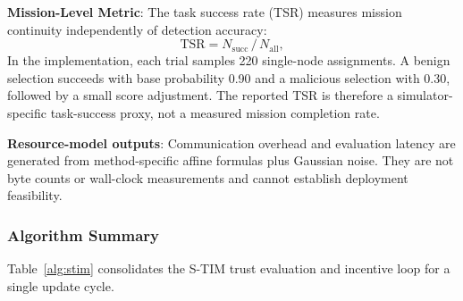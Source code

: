 \documentclass[notspecified,article,submit,moreauthors]{Definitions/mdpi}
\begin{document}
\textbf{Mission-Level Metric}: The task success rate (TSR) measures mission continuity independently of detection accuracy:
\begin{equation}\label{eq:tsr}
\mathrm{TSR} = N_{\mathrm{succ}} \,/\, N_{\mathrm{all}},
\end{equation}
In the implementation, each trial samples 220 single-node assignments. A benign selection succeeds with base probability 0.90 and a malicious selection with 0.30, followed by a small score adjustment. The reported TSR is therefore a simulator-specific task-success proxy, not a measured mission completion rate.

\textbf{Resource-model outputs}: Communication overhead and evaluation latency are generated from method-specific affine formulas plus Gaussian noise. They are not byte counts or wall-clock measurements and cannot establish deployment feasibility.

\subsubsection{Algorithm Summary}
Table~\ref{alg:stim} consolidates the S-TIM trust evaluation and incentive loop for a single update cycle.
\end{document}

